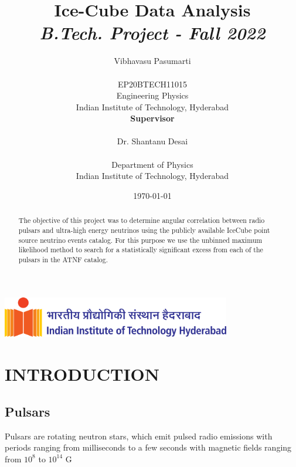 \documentclass{report}
\title{Ice-Cube Data Analysis\\ \textit{B.Tech. Project - Fall 2022}}
\author{\huge
\onehalfspacing
  Vibhavasu Pasumarti \\\\
  \Large
  EP20BTECH11015\\
  \Large
  Engineering Physics\\
  \Large
  Indian Institute of Technology, Hyderabad \\[1in]
  \huge
  \textbf{Supervisor}\\\\
  \huge
  Dr. Shantanu Desai\\\\
  \Large
  Department of Physics\\
  \Large
  Indian Institute of Technology, Hyderabad 
}
\date{\today}
\begin{document}
\begin{center}
\includegraphics[width=0.75\textwidth]{Images/horzlogolong.png}
\end{center}

\maketitle 

\newpage
\tableofcontents
\newpage




\begin{abstract}
\large
The objective of this project was to determine angular correlation between radio pulsars and ultra-high energy neutrinos using the publicly available IceCube point source neutrino events catalog. For this purpose we use the
unbinned maximum likelihood method to search for a statistically significant excess from each of the pulsars in the ATNF catalog.
\end{abstract}
\newpage
\large
\chapter{\Huge INTRODUCTION}
\section{Pulsars}
Pulsars are rotating neutron stars, which emit pulsed radio emissions with periods ranging from  milliseconds to a few seconds  with  magnetic fields ranging from $10^8$ to $10^{14}$ G
\end{document}
